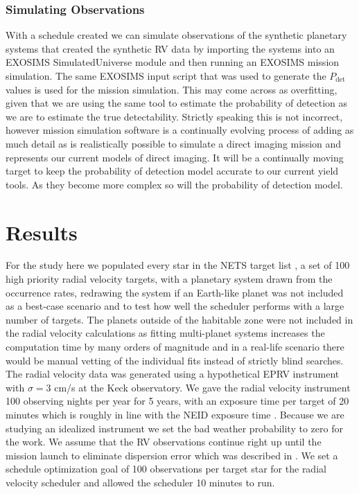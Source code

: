 \subsubsection{Simulating Observations}

With a schedule created we can simulate observations of the synthetic planetary
systems that created the synthetic RV data by importing the systems into an
EXOSIMS SimulatedUniverse module and then running an EXOSIMS mission
simulation. The same EXOSIMS input script that was used to generate the
$P_\textrm{det}$ values is used for the mission simulation. This may come
across as overfitting, given that we are using the same tool to estimate the
probability of detection as we are to estimate the true detectability. Strictly
speaking this is not incorrect, however mission simulation software is a
continually evolving process of adding as much detail as is realistically
possible to simulate a direct imaging mission and represents our current models
of direct imaging. It will be a continually moving target to keep the
probability of detection model accurate to our current yield tools. As they
become more complex so will the probability of detection model.

\section{Results}

For the study here we populated every star in the NETS target list
\citep{guptaTargetPrioritization2021}, a set of 100 high priority radial
velocity targets, with a planetary system drawn from the
\citet{dulzJointRadialVelocity2020} occurrence rates, redrawing the system if
an Earth-like planet was not included as a best-case scenario and to test how
well the scheduler performs with a large number of targets. The planets outside
of the habitable zone were not included in the radial velocity calculations as
fitting multi-planet systems increases the computation time by many orders of
magnitude and in a real-life scenario there would be manual vetting of the
individual fits instead of strictly blind searches. The radial velocity data
was generated using a hypothetical EPRV instrument with $\sigma = 3$ cm/s at
the Keck observatory. We gave the radial velocity instrument 100 observing
nights per year for 5 years, with an exposure time per target of 20 minutes
which is roughly in line with the NEID exposure time
\citep{guptaTargetPrioritization2021}. Because we are studying an idealized
instrument we set the bad weather probability to zero for the work. We assume
that the RV observations continue right up until the mission launch to
eliminate dispersion error which was described in . We
set a schedule optimization goal of 100 observations per target star for the
radial velocity scheduler and allowed the scheduler 10 minutes to run.

